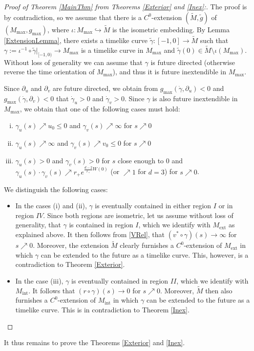 \documentclass[reqno]{article}
\newcommand{\Mint}{M_{\mathrm{int}}}
\newcommand{\Mext}{M_{\mathrm{ext}}}
\newcommand{\Mmax}{M_{\mathrm{max}}}
\newcommand{\gmax}{g_{\mathrm{max}}}
\begin{document}
\begin{proof}[Proof of Theorem \ref{MainThm} from Theorems \ref{Exterior} and \ref{Inex}:]
The proof is by contradiction, so we assume that there is a $C^0$-extension $(\tilde{M}, \tilde{g})$  of $(\Mmax, \gmax)$, where  $\iota : \Mmax \hookrightarrow \tilde{M}$ is the isometric embedding. By Lemma \ref{ExtensionLemma}, there exists a timelike curve $\tilde{\gamma} : [-1,0] \to \tilde{M}$ such that $\gamma := \iota^{-1} \circ \tilde{\gamma}|_{[-1, 0)} \to \Mmax$ is a timelike curve in $\Mmax$ and $\tilde{\gamma}(0) \in \tilde{M} \setminus \iota(\Mmax)$. Without loss of generality we can assume that $\gamma$ is future directed (otherwise reverse the time orientation of $\Mmax$), and thus it is future inextendible in $\Mmax$.

Since $\partial_u$ and $\partial_v$ are future directed, we obtain from $\gmax(\dot{\gamma}, \partial_u) <0$ and $\gmax(\dot{\gamma}, \partial_v)<0$ that $\dot{\gamma}_u >0$ and $\dot{\gamma}_v >0$. Since $\gamma$ is also future inextendible in $\Mmax$, we obtain that one of the following cases must hold:
\begin{enumerate}[(i)]
\item $\gamma_u(s) \nearrow u_0 \leq 0$ and $\gamma_v(s) \nearrow \infty$ for $s \nearrow 0$
\item $\gamma_u(s) \nearrow \infty$ and $\gamma_v(s) \nearrow v_0  \leq 0$ for $s \nearrow 0$
\item $\gamma_u(s) >0$ and $\gamma_v(s) >0$ for $s$ close enough to $0$ and $\gamma_u(s) \cdot \gamma_v(s) \nearrow r_+ e^{\frac{d-2}{r_+}W(0)}$ (or $\nearrow 1$ for $d=3$) for $s \nearrow 0$.
\end{enumerate} 
We distinguish the following cases:
\begin{itemize}
\item
In the cases (i) and (ii),  $\gamma$ is eventually contained in either region $I$ or in region $IV$. Since both regions are isometric, let us assume without loss of generality, that $\gamma$ is contained in region $I$, which we identify with $\Mext$ as explained above. It then follows from \eqref{VRel}, that $(v^* \circ \gamma) (s) \to \infty$ for $s \nearrow 0$. Moreover, the extension $\tilde{M}$ clearly furnishes a $C^0$-extension of $\Mext$ in which $\gamma$ can be extended to the future as a timelike curve. This, however, is a contradiction to Theorem \ref{Exterior}.
\item
In the case (iii), $\gamma$ is eventually contained in region $II$, which we identify with $\Mint$. It follows that $(r \circ \gamma)(s) \to 0$ for $s \nearrow 0$. Moreover, $\tilde{M}$ then also furnishes a $C^0$-extension of $\Mint$ in which $\gamma$ can be extended to the future as a timelike curve. This is in contradiction to Theorem \ref{Inex}.
\end{itemize}
\end{proof}
It thus remains to prove the Theorems \ref{Exterior} and \ref{Inex}.
\end{document}
